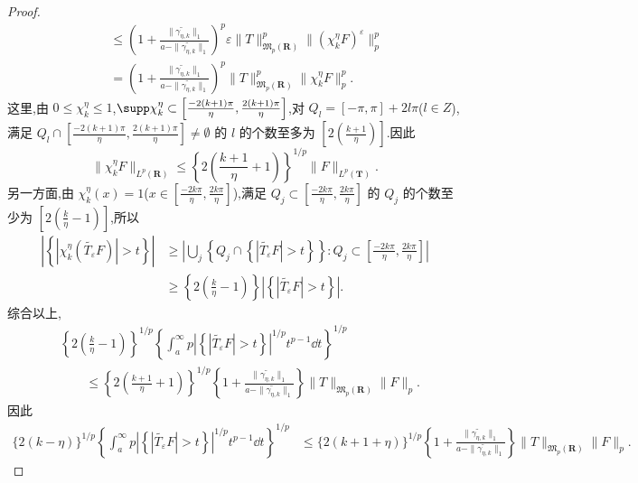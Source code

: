 \begin{proof}
\begin{align*}
&\quad \leq \left(1 + \frac{\|\widetilde{\gamma_{\eta,k}}\|_{1}}{a - \|\widetilde{\gamma_{\eta,k}}\|_{1}}\right)^{p}\varepsilon\|T\|_{\mathfrak{M}_{p}(\mathbf{R})}^{p}\|(\chi_{k}^{\eta}F)^{\varepsilon}\|_{p}^{p}\\
&\quad = \left(1 + \frac{\|\widetilde{\gamma_{\eta,k}}\|_{1}}{a - \|\widetilde{\gamma_{\eta,k}}\|_{1}}\right)^{p}\|T\|_{\mathfrak{M}_{p}(\mathbf{R})}^{p}\|\chi_{k}^{\eta}F\|_{p}^{p}.
\end{align*}
这里,由 $0 \leq \chi_{k}^{\eta} \leq 1$,$\supp\chi_{k}^{\eta} \subset \left[\frac{-2(k+1)\pi}{\eta}, \frac{2(k+1)\pi}{\eta}\right]$,对 $Q_{l} = [-\pi, \pi] + 2l\pi$($l \in Z$),满足 $Q_{l} \cap \left[\frac{-2(k+1)\pi}{\eta}, \frac{2(k+1)\pi}{\eta}\right] \neq \emptyset$ 的 $l$ 的个数至多为 $\left[2\left(\frac{k+1}{\eta}\right)\right]$.因此
\begin{equation*}
\|\chi_{k}^{\eta}F\|_{L^{p}(\mathbf{R})} \leq \left\{2\left(\frac{k+1}{\eta} + 1\right)\right\}^{1/p}\|F\|_{L^{p}(\mathbf{T})}.
\end{equation*}
另一方面,由 $\chi_{k}^{\eta}(x) = 1$($x \in \left[\frac{-2k\pi}{\eta}, \frac{2k\pi}{\eta}\right]$),满足 $Q_{j} \subset \left[\frac{-2k\pi}{\eta}, \frac{2k\pi}{\eta}\right]$ 的 $Q_{j}$ 的个数至少为 $\left[2\left(\frac{k}{\eta} - 1\right)\right]$,所以
\begin{align*}
\left|\left\{\left|\chi_{k}^{\eta}(\widetilde{T_{\varepsilon}}F)\right| > t\right\}\right| &\geq \left|\bigcup_{j}\left\{Q_{j} \cap \left\{\left|\widetilde{T_{\varepsilon}}F\right| > t\right\}\right\}: Q_{j} \subset \left[\frac{-2k\pi}{\eta}, \frac{2k\pi}{\eta}\right]\right|\\
&\geq \left\{2\left(\frac{k}{\eta} - 1\right)\right\}\left|\left\{\left|\widetilde{T_{\varepsilon}}F\right| > t\right\}\right|.
\end{align*}
综合以上,
\begin{align*}
&\left\{2\left(\frac{k}{\eta} - 1\right)\right\}^{1/p}\left\{\int_{a}^{\infty}p\left|\left\{\left|\widetilde{T_{\varepsilon}}F\right| > t\right\}\right|^{1/p}t^{p-1}\dd t\right\}^{1/p}\\
&\qquad \leq \left\{2\left(\frac{k+1}{\eta} + 1\right)\right\}^{1/p}\left\{1 + \frac{\|\widetilde{\gamma_{\eta,k}}\|_{1}}{a - \|\widetilde{\gamma_{\eta,k}}\|_{1}}\right\}\|T\|_{\mathfrak{M}_{p}(\mathbf{R})}\|F\|_{p}.
\end{align*}
因此
\begin{align*}
\{2(k - \eta)\}^{1/p}\left\{\int_{a}^{\infty}p\left|\left\{\left|\widetilde{T_{\varepsilon}}F\right| > t\right\}\right|^{1/p}t^{p-1}\dd t\right\}^{1/p}&\leq \{2(k + 1 + \eta)\}^{1/p}\left\{1 + \frac{\|\widetilde{\gamma_{\eta,k}}\|_{1}}{a - \|\widetilde{\gamma_{\eta,k}}\|_{1}}\right\}\|T\|_{\mathfrak{M}_{p}(\mathbf{R})}\|F\|_{p}.

\end{align*}
\end{proof}
